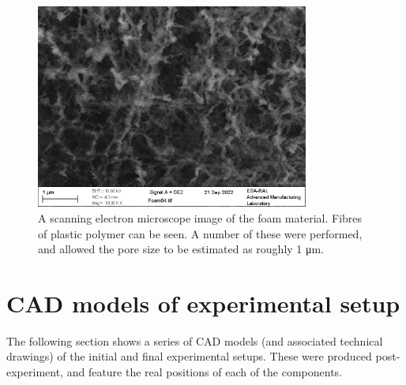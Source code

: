\begin{figure}[!h]
\begin{centering}
\includegraphics[width=0.8\textwidth]{figures/AppendixExperiment/FoamSEM.jpg}%
\caption{\label{fig:Appx-Foam04} A scanning electron microscope image of the foam material. Fibres of plastic polymer can be seen. A number of these were performed, and allowed the pore size to be estimated as roughly 1 \unit{\micro\meter}.}
\end{centering}
\end{figure}

\FloatBarrier

\section{CAD models of experimental setup}

The following section shows a series of CAD models (and associated technical drawings) of the initial and final experimental setups. These were produced post-experiment, and feature the real positions of each of the components.


